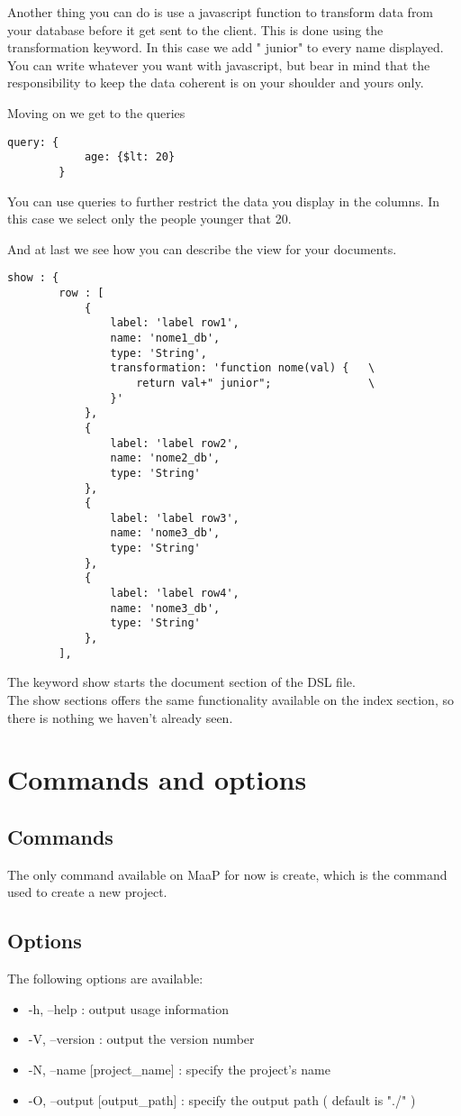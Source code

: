 Another thing you can do is use a javascript function to transform data from your database before it get sent to the client.
This is done using the transformation keyword. In this case we add " junior" to every name displayed.\\
You can write whatever you want with javascript, but bear in mind that the responsibility to keep the data coherent is on your shoulder and yours only.


Moving on we get to the queries\\

\begin{lstlisting}
query: {
			age: {$lt: 20}
		}
\end{lstlisting}
You can use queries to further restrict the data you display in the columns. In this case we select only the people younger that 20.


And at last we see how you can describe the view for your documents.\\

\begin{lstlisting}
show : {
		row : [
			{
				label: 'label row1',
				name: 'nome1_db',
				type: 'String',
				transformation: 'function nome(val) {	\
					return val+" junior";				\
				}'
			},
			{	
				label: 'label row2',
				name: 'nome2_db',
				type: 'String'
			},
			{	
				label: 'label row3',
				name: 'nome3_db',
				type: 'String'
			},
			{	
				label: 'label row4',
				name: 'nome3_db',
				type: 'String'
			},
		],

\end{lstlisting}



The keyword show starts the document section of the DSL file.\\
The show sections offers the same functionality available on the index section, so there is nothing we haven't already seen.


\section{Commands and options}

\subsection{Commands}
\label{commands}
The only command available on MaaP for now is create, which is the command used to create a new project.

\subsection{Options}
\label{options}
The following options are available:
\begin{itemize}
\item -h, --help    :              output usage information
\item -V, --version  :             output the version number
\item -N, --name [project\_name] :  specify the project's name
\item -O, --output [output\_path] : specify the output path ( default is "./" )
\end{itemize}

